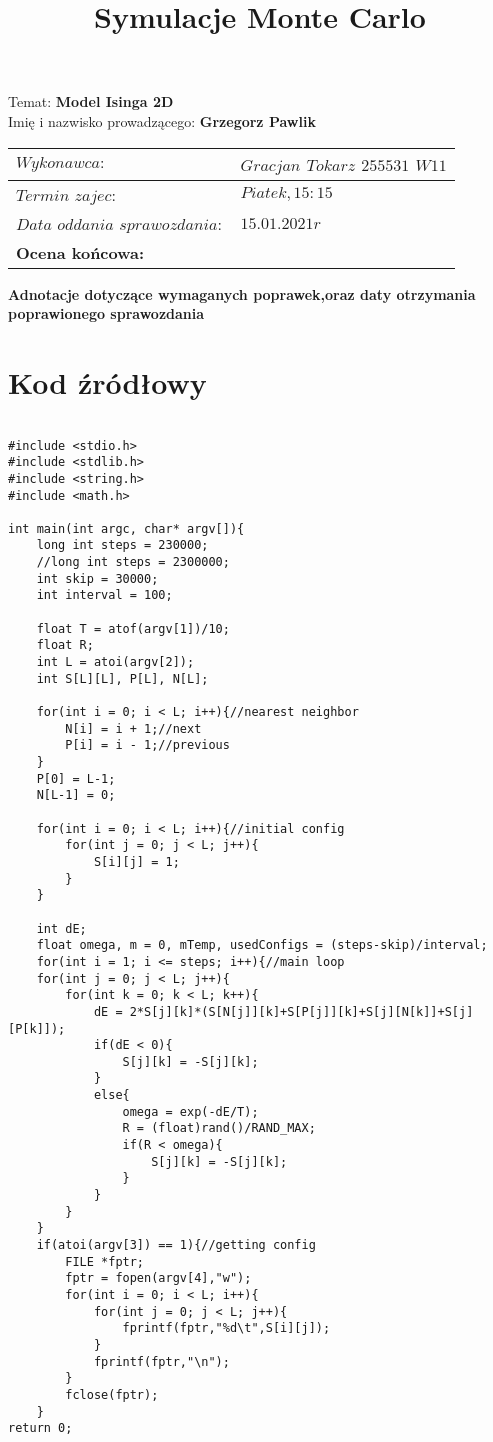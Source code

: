 \documentclass{article}
\title{Symulacje Monte Carlo}
\date{}
\begin{document}
\maketitle
Temat: \textbf{Model Isinga 2D}\\
Imię i nazwisko prowadzącego: \textbf{Grzegorz Pawlik}

\begin{center}
\begin{tabular}{|p{5cm}|p{6cm}|}
\hline
$Wykonawca:$ & $Gracjan$ $Tokarz$ $255531$ $W11$  \\
\hline
$Termin$ $zajec:$ & $Piatek , 15:15$\\
\hline
$Data$ $oddania$ $sprawozdania:$ & $15.01.2021r$\\
\hline
\textbf{Ocena	końcowa:} & \\
\hline
\end{tabular}
\end{center}

\textbf{Adnotacje dotyczące wymaganych poprawek,oraz daty otrzymania poprawionego sprawozdania}

\newpage

\section{Kod źródłowy}

\lstset{
	language=C++
}
\begin{lstlisting}[basicstyle=\small]

#include <stdio.h>
#include <stdlib.h>
#include <string.h>
#include <math.h>

int main(int argc, char* argv[]){
	long int steps = 230000;
	//long int steps = 2300000;
	int skip = 30000;
	int interval = 100;

	float T = atof(argv[1])/10;
	float R;
	int L = atoi(argv[2]);
	int S[L][L], P[L], N[L];

	for(int i = 0; i < L; i++){//nearest neighbor
		N[i] = i + 1;//next
		P[i] = i - 1;//previous
	}
	P[0] = L-1;
	N[L-1] = 0;

	for(int i = 0; i < L; i++){//initial config
		for(int j = 0; j < L; j++){
			S[i][j] = 1;
		}
	}

	int dE; 
	float omega, m = 0, mTemp, usedConfigs = (steps-skip)/interval;
	for(int i = 1; i <= steps; i++){//main loop
	for(int j = 0; j < L; j++){
		for(int k = 0; k < L; k++){
			dE = 2*S[j][k]*(S[N[j]][k]+S[P[j]][k]+S[j][N[k]]+S[j][P[k]]);
			if(dE < 0){
				S[j][k] = -S[j][k];
			}
			else{
				omega = exp(-dE/T);
				R = (float)rand()/RAND_MAX;
				if(R < omega){
					S[j][k] = -S[j][k];
				}
			}
		}
	}
	if(atoi(argv[3]) == 1){//getting config
		FILE *fptr;
		fptr = fopen(argv[4],"w");
		for(int i = 0; i < L; i++){
			for(int j = 0; j < L; j++){
				fprintf(fptr,"%d\t",S[i][j]);
			}
			fprintf(fptr,"\n");
		}
		fclose(fptr);
	}	
return 0;

\end{lstlisting}
\end{document}
